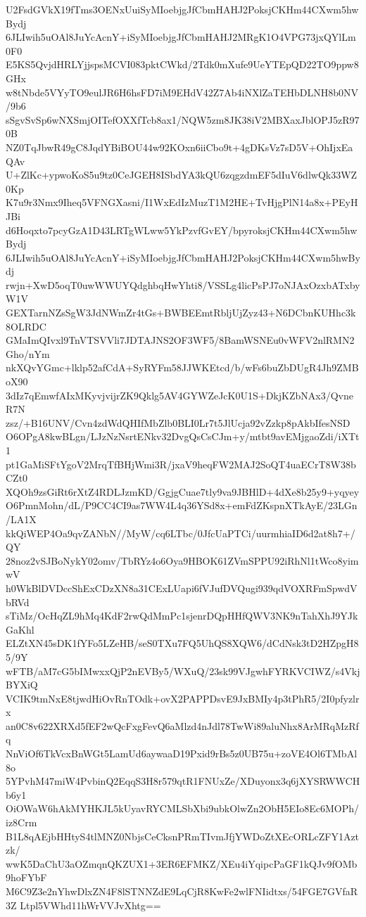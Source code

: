 U2FsdGVkX19fTms3OENxUuiSyMIoebjgJfCbmHAHJ2PoksjCKHm44CXwm5hwBydj
6JLIwih5uOAl8JuYcAcnY+iSyMIoebjgJfCbmHAHJ2MRgK1O4VPG73jxQYlLm0F0
E5KS5QvjdHRLYjjspsMCVI083pktCWkd/2Tdk0mXufe9UeYTEpQD22TO9ppw8GHx
w8tNbde5VYyTO9eulJR6H6hsFD7iM9EHdV42Z7Ab4iNXlZaTEHbDLNH8b0NV/9b6
sSgvSvSp6wNXSmjOITefOXXfTcb8ax1/NQW5zm8JK38iV2MBXaxJblOPJ5zR970B
NZ0TqJbwR49gC8JqdYBiBOU44w92KOxn6iiCbo9t+4gDKsVz7sD5V+OhIjxEaQAv
U+ZlKc+ypwoKoS5u9tz0CeJGEH8ISbdYA3kQU6zqgzdmEF5dIuV6dlwQk33WZ0Kp
K7u9r3Nmx9Iheq5VFNGXasni/I1WxEdIzMuzT1M2HE+TvHjgPlN14a8x+PEyHJBi
d6Hoqxto7pcyGzA1D43LRTgWLww5YkPzvfGvEY/bpyroksjCKHm44CXwm5hwBydj
6JLIwih5uOAl8JuYcAcnY+iSyMIoebjgJfCbmHAHJ2PoksjCKHm44CXwm5hwBydj
rwjn+XwD5oqT0uwWWUYQdghbqHwYhti8/VSSLg4licPsPJ7oNJAxOzxbATxbyW1V
GEXTarnNZsSgW3JdNWmZr4tGs+BWBEEmtRbljUjZyz43+N6DCbnKUHhc3k8OLRDC
GMaImQIvxl9TnVTSVVli7JDTAJNS2OF3WF5/8BamWSNEu0vWFV2nlRMN2Gho/nYm
nkXQvYGmc+lklp52afCdA+SyRYFm58JJWKEtcd/b/wFs6buZbDUgR4Jh9ZMBoX90
3dIz7qEmwfAIxMKyvjvijrZK9Qklg5AV4GYWZeJcK0U1S+DkjKZbNAx3/QvneR7N
zsz/+B16UNV/Cvn4zdWdQHIfMbZlb0BLI0Lr7t5JlUcja92vZzkp8pAkbIfesNSD
O6OPgA8kwBLgn/LJzNzNsrtENkv32DvgQsCsCJm+y/mtbt9avEMjgaoZdi/iXTt1
pt1GaMiSFtYgoV2MrqTfBHjWmi3R/jxaV9heqFW2MAJ2SoQT4uaECrT8W38bCZt0
XQOh9zsGiRt6rXtZ4RDLJzmKD/GgjgCuae7tly9va9JBHlD+4dXe8b25y9+yqyey
O6PmnMohn/dL/P9CC4CI9as7WW4L4q36YSd8x+emFdZKspnXTkAyE/23LGn/LA1X
kkQiWEP4Oa9qvZANbN//MyW/cq6LTbc/0JfcUaPTCi/uurmhiaID6d2at8h7+/QY
28noz2vSJBoNykY02omv/TbRYz4o6Oya9HBOK61ZVmSPPU92iRhNl1tWco8yimwV
h0WkBlDVDccShExCDzXN8a31CExLUapi6fVJufDVQugi939qdVOXRFmSpwdVbRVd
sTiMz/OcHqZL9hMq4KdF2rwQdMmPc1sjenrDQpHHfQWV3NK9nTahXhJ9YJkGaKhl
ELZtXN45sDK1fYFo5LZeHB/seS0TXu7FQ5UhQS8XQW6/dCdNsk3tD2HZpgH85/9Y
wFTB/aM7cG5bIMwxxQjP2nEVBy5/WXuQ/23sk99VJgwhFYRKVCIWZ/s4VkjBYXiQ
VCIK9tmNxE8tjwdHiOvRnTOdk+ovX2PAPPDsvE9JxBMIy4p3tPhR5/2I0pfyzlrx
an0C8v622XRXd5fEF2wQcFxgFevQ6aMlzd4nJdl78TwWi89aluNhx8ArMRqMzRfq
NnViOf6TkVcxBnWGt5LamUd6aywaaD19Pxid9rBs5z0UB75u+zoVE4Ol6TMbAl8o
5YPvhM47miW4PvbinQ2EqqS3H8r579qtR1FNUxZe/XDuyonx3q6jXYSRWWCHb6y1
OiOWaW6hAkMYHKJL5kUyavRYCMLSbXbi9ubkOlwZn2ObH5EIo8Ec6MOPh/iz8Crm
B1L8qAEjbHHtyS4tlMNZ0NbjsCeCksnPRmTIvmJfjYWDoZtXEcORLcZFY1Aztzk/
wwK5DaChU3aOZmqnQKZUX1+3ER6EFMKZ/XEu4iYqipcPaGF1kQJv9fOMb9hoFYbF
M6C9Z3e2nYhwDlxZN4F8lSTNNZdE9LqCjR8KwFe2wlFNIidtxs/54FGE7GVfaR3Z
Ltpl5VWhd11hWrVVJvXhtg==
